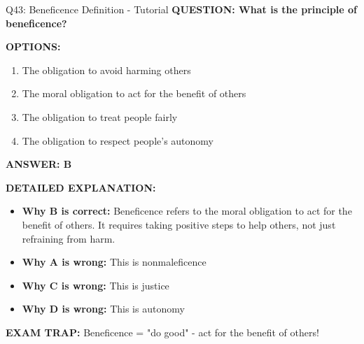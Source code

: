 \documentclass[8pt]{beamer}
\begin{document}
	\begin{frame}{Q43: Beneficence Definition - Tutorial}
		\fontsize{6.5}{7.5}\selectfont
		\textbf{QUESTION: What is the principle of beneficence?}
		
		\vspace{0.1cm}
		\textbf{OPTIONS:}
		\begin{enumerate}
			\item The obligation to avoid harming others
			\item The moral obligation to act for the benefit of others
			\item The obligation to treat people fairly
			\item The obligation to respect people's autonomy
		\end{enumerate}
		
		\vspace{0.1cm}
		\textcolor{myblue}{\textbf{ANSWER: B}}
		
		\vspace{0.1cm}
		\textbf{DETAILED EXPLANATION:}
		\begin{itemize}
			\item \textbf{Why B is correct:} Beneficence refers to the moral obligation to act for the benefit of others. It requires taking positive steps to help others, not just refraining from harm.
			\item \textbf{Why A is wrong:} This is nonmaleficence
			\item \textbf{Why C is wrong:} This is justice
			\item \textbf{Why D is wrong:} This is autonomy
		\end{itemize}
		
		\textcolor{myred}{\textbf{EXAM TRAP:}} Beneficence = \textcolor{myblue}{"do good"} - act for the benefit of others!
	\end{frame}
	
\end{document}
